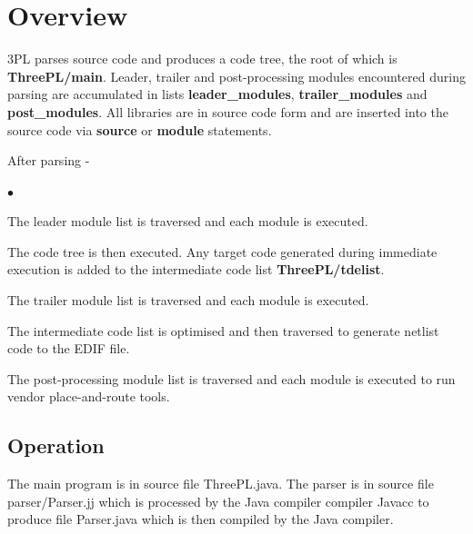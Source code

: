 \documentclass[10pt,a4paper,twoside,fleqn]{book}
\newcommand{\blist}{\begin{list}{$\bullet$}{\setlength{\itemsep}{-5pt}\setlength{\topsep}{-5pt}}}
\newcommand{\blend}{\end{list}}
\begin{document}
     
\makecsirotitle
  

\setlength{\parskip}{0pt}
{}
\tableofcontents
\setlength{\parskip}{0.6pc plus 0.2pc minus 0.2pc}

\cleardoublepage

\setcounter{page}{1}



\chapter{Overview}

    3PL parses source code and produces a code tree, the root of which is {\bf
    ThreePL/main}. Leader, trailer and post-processing modules encountered during
    parsing are accumulated in lists {\bf leader\_modules}, {\bf trailer\_modules}
    and {\bf post\_modules}. All libraries are in source code form and are
    inserted into the source code via {\bf source} or {\bf module} statements.
    
    After parsing -
    \blist
    \item   The leader module list is traversed and each module is executed.
    \item   The code tree is then executed. Any target code generated during
            immediate execution is added to the intermediate code list {\bf
            ThreePL/tdelist}.
    \item   The trailer module list is traversed and each module is executed.
    \item   The intermediate code list is optimised and then traversed to
            generate netlist code to the EDIF file.
    \item   The post-processing module list is traversed and each module is
            executed to run vendor place-and-route tools.
    \blend


    \section{Operation}
    

        The main program is in source file ThreePL.java. The parser is in source
        file parser/Parser.jj which is processed by the Java compiler compiler
        Javacc to produce file Parser.java which is then compiled by the Java
        compiler.
\end{document}
